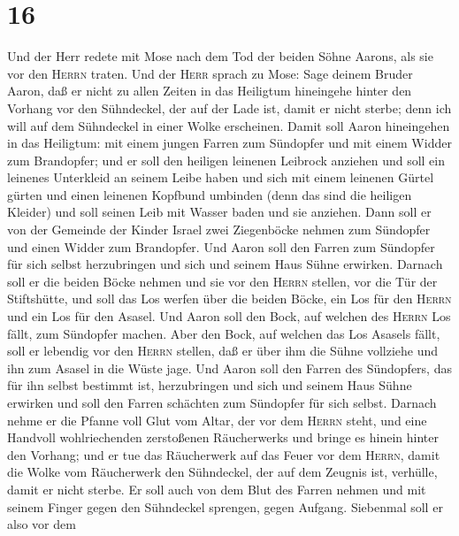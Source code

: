 \hypertarget{section-15}{%
\section{16}\label{section-15}}

 Und der Herr redete mit Mose nach dem Tod der beiden
Söhne Aarons, als sie vor den \textsc{Herrn} traten.  Und
der \textsc{Herr} sprach zu Mose: Sage deinem Bruder Aaron, daß er nicht
zu allen Zeiten in das Heiligtum hineingehe hinter den Vorhang vor den
Sühndeckel, der auf der Lade ist, damit er nicht sterbe; denn ich will
auf dem Sühndeckel in einer Wolke erscheinen.  Damit soll
Aaron hineingehen in das Heiligtum: mit einem jungen Farren zum
Sündopfer und mit einem Widder zum Brandopfer;  und er
soll den heiligen leinenen Leibrock anziehen und soll ein leinenes
Unterkleid an seinem Leibe haben und sich mit einem leinenen Gürtel
gürten und einen leinenen Kopfbund umbinden (denn das sind die heiligen
Kleider) und soll seinen Leib mit Wasser baden und sie anziehen.
 Dann soll er von der Gemeinde der Kinder Israel zwei
Ziegenböcke nehmen zum Sündopfer und einen Widder zum Brandopfer.
 Und Aaron soll den Farren zum Sündopfer für sich selbst
herzubringen und sich und seinem Haus Sühne erwirken. 
Darnach soll er die beiden Böcke nehmen und sie vor den \textsc{Herrn}
stellen, vor die Tür der Stiftshütte,  und soll das Los
werfen über die beiden Böcke, ein Los für den \textsc{Herrn} und ein Los
für den Asasel.  Und Aaron soll den Bock, auf welchen des
\textsc{Herrn} Los fällt, zum Sündopfer machen.  Aber den
Bock, auf welchen das Los Asasels fällt, soll er lebendig vor den
\textsc{Herrn} stellen, daß er über ihm die Sühne vollziehe und ihn zum
Asasel in die Wüste jage.  Und Aaron soll den Farren des
Sündopfers, das für ihn selbst bestimmt ist, herzubringen und sich und
seinem Haus Sühne erwirken und soll den Farren schächten zum Sündopfer
für sich selbst.  Darnach nehme er die Pfanne voll Glut
vom Altar, der vor dem \textsc{Herrn} steht, und eine Handvoll
wohlriechenden zerstoßenen Räucherwerks und bringe es hinein hinter den
Vorhang;  und er tue das Räucherwerk auf das Feuer vor
dem \textsc{Herrn}, damit die Wolke vom Räucherwerk den Sühndeckel, der
auf dem Zeugnis ist, verhülle, damit er nicht sterbe.  Er
soll auch von dem Blut des Farren nehmen und mit seinem Finger gegen den
Sühndeckel sprengen, gegen Aufgang. Siebenmal soll er also vor dem
